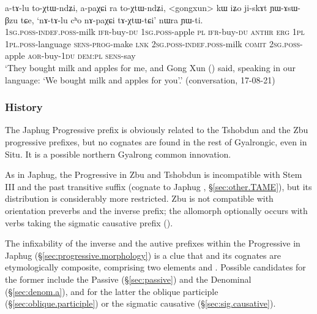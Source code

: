 \begin{exe}
\ex \label{ex:YAsWBzu.YWti}
\gll a-tɤ-lu to-χtɯ-ndʑi, a-paχɕi ra to-χtɯ-ndʑi, <gongxun> kɯ iʑo ji-skɤt ɲɯ-ɤsɯ-βzu tɕe, `nɤ-tɤ-lu cʰo nɤ-paχɕi tɤ-χtɯ-tɕi' nɯra ɲɯ-ti. \\
\textsc{1sg}.\textsc{poss}-\textsc{indef}.\textsc{poss}-milk \textsc{ifr}-buy-\textsc{du} \textsc{1sg}.\textsc{poss}-apple \textsc{pl} \textsc{ifr}-buy-\textsc{du}  \textsc{anthr} \textsc{erg} \textsc{1pl} \textsc{1pl}.\textsc{poss}-language \textsc{sens}-\textsc{prog}-make \textsc{lnk} \textsc{2sg}.\textsc{poss}-\textsc{indef}.\textsc{poss}-milk \textsc{comit} \textsc{2sg}.\textsc{poss}-apple \textsc{aor}-buy-\textsc{1du} \textsc{dem}:\textsc{pl} \textsc{sens}-say  \\
\glt `They bought milk and apples for me, and Gong Xun () said, speaking in our language: `We bought milk and apples for you'.' (conversation, 17-08-21)
\end{exe}

\subsubsection{History} \label{sec:progressive.history}
The Japhug Progressive prefix  is obviously related to the Tshobdun  \citep[89]{jackson02rentongdengdi} and the Zbu  \citep[199--201]{gong18these} progressive prefixes, but no cognates are found in the rest of Gyalrongic, even in Situ. It is a possible northern Gyalrong common innovation.

As in Japhug, the Progressive  in Zbu and Tshobdun is incompatible with Stem III and the past transitive  suffix (cognate to Japhug , §\ref{sec:other.TAME}), but its distribution is considerably more restricted. Zbu  is not compatible with orientation preverbs and the inverse prefix; the allomorph  optionally occurs with verbs taking the sigmatic causative prefix (\citealt[199--200]{gong18these}).

The infixability of the inverse and the autive prefixes within the Progressive in Japhug (§\ref{sec:progressive.morphology}) is a clue that  and its cognates are etymologically composite, comprising two elements  and . Possible candidates for the former include the Passive (§\ref{sec:passive}) and the Denominal  (§\ref{sec:denom.a}), and for the latter the oblique participle  (§\ref{sec:oblique.participle}) or the sigmatic causative  (§\ref{sec:sig.causative}).


